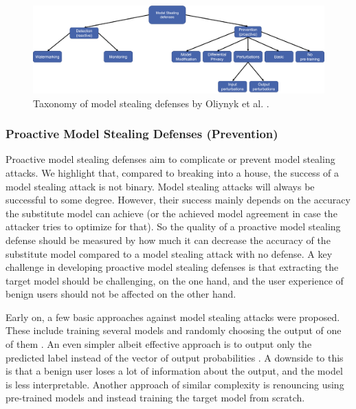 \begin{figure} [ht]
    \centering
    \includegraphics[width=\linewidth]{images/MS_defenses_Taxonomy.png}
    \caption[Taxonomy of model stealing defenses]{Taxonomy of model stealing defenses by Oliynyk et al. \cite{oliynyk2022know}.}
    \label{fig:ModelStealingDefenses:Taxonomy}
  \end{figure}

\subsubsection{Proactive Model Stealing Defenses (Prevention)}
\label{sec:ModelStealing:Defenses:Prevention}
Proactive model stealing defenses aim to complicate or prevent model stealing attacks. We highlight that, compared to breaking into a house,
the success of a model stealing attack is not binary. Model stealing attacks will always be successful to some degree. However, their success mainly depends on the accuracy the substitute model
can achieve (or the achieved model agreement in case the attacker tries to optimize for that). So the quality of a proactive model stealing defense should be measured by how much it can 
decrease the accuracy of the substitute model compared to a model stealing attack with no defense. A key challenge in developing proactive model stealing defenses is that
extracting the target model should be challenging, on the one hand,  and the user experience of benign users should not be affected on the other hand. \par
Early on, a few basic approaches against model stealing attacks were proposed. These include training several models and randomly choosing the output of one of them 
\cite{alabdulmohsin2014adding}. An even simpler albeit effective approach is to output only the predicted label instead of the vector of output probabilities \cite{tramer2016stealing}.
A downside to this is that a benign user loses a lot of information about the output, and the model is less interpretable. Another approach of similar complexity is renouncing
using pre-trained models \cite{atli2020extraction} and instead training the target model from scratch. \par

